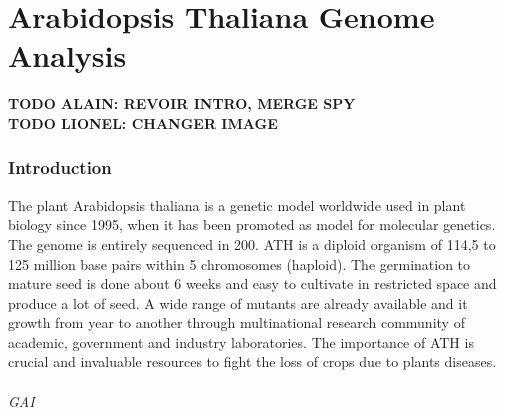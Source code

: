 \documentclass[10pt,a4paper]{article}
\begin{document}
\newpage
\part*{Arabidopsis Thaliana Genome Analysis}

\textbf{TODO ALAIN: REVOIR INTRO, MERGE SPY}\\

\textbf{TODO LIONEL: CHANGER IMAGE}

\section*{Introduction}
The plant Arabidopsis thaliana is a genetic model worldwide used in plant biology since 1995, when it has been promoted as model for molecular genetics. The genome is entirely sequenced in 200. ATH is a diploid organism of 114,5 to 125 million base pairs within 5 chromosomes (haploid). The germination to mature seed is done about 6 weeks and easy to cultivate in restricted space and produce a lot of seed. A wide range of mutants are already available and it growth from year to another through multinational research community of academic, government and industry laboratories. The importance of ATH is crucial and invaluable resources to fight the loss of crops due to plants diseases.


%
%
%


\paragraph{GAI} 
\end{document}
